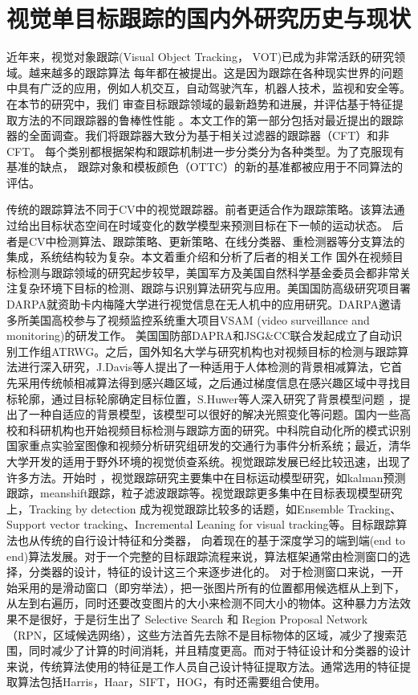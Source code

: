 \documentclass[promaster]{thesis-uestc}
\begin{document}
\section{视觉单目标跟踪的国内外研究历史与现状}

近年来，视觉对象跟踪(Visual Object Tracking， VOT)已成为非常活跃的研究领域。越来越多的跟踪算法
每年都在被提出。这是因为跟踪在各种现实世界的问题中具有广泛的应用，例如人机交互，自动驾驶汽车，机器人技术，监视和安全等。在本节的研究中，我们
审查目标跟踪领域的最新趋势和进展，并评估基于特征提取方法的不同跟踪器的鲁棒性性能
。本文工作的第一部分包括对最近提出的跟踪器的全面调查。我们将跟踪器大致分为基于相关过滤器的跟踪器（CFT）和非CFT。
每个类别都根据架构和跟踪机制进一步分类分为各种类型。为了克服现有基准的缺点，
跟踪对象和模板颜色（OTTC）的新的基准都被应用于不同算法的评估。

传统的跟踪算法不同于CV中的视觉跟踪器。前者更适合作为跟踪策略。该算法通过给出目标状态空间在时域变化的数学模型来预测目标在下一帧的运动状态。
后者是CV中检测算法、跟踪策略、更新策略、在线分类器、重检测器等分支算法的集成，系统结构较为复杂。本文着重介绍和分析了后者的相关工作
国外在视频目标检测与跟踪领域的研究起步较早，美国军方及美国自然科学基金委员会都非常关注复杂环境下目标的检测、跟踪与识别算法研究与应用。美国国防高级研究项目署DARPA就资助卡内梅隆大学进行视觉信息在无人机中的应用研究。DARPA邀请多所美国高校参与了视频监控系统重大项目VSAM (video surveillance and monitoring)的研发工作。
美国国防部DAPRA和JSG\&CC联合发起成立了自动识别工作组ATRWG。之后，国外知名大学与研究机构也对视频目标的检测与跟踪算法进行深入研究，J.Davis等人提出了一种适用于人体检测的背景相减算法，它首先采用传统帧相减算法得到感兴趣区域，之后通过梯度信息在感兴趣区域中寻找目标轮廓，通过目标轮廓确定目标位置，S.Huwer等人深入研究了背景模型问题
，提出了一种自适应的背景模型，该模型可以很好的解决光照变化等问题。国内一些高校和科研机构也开始视频目标检测与跟踪方面的研究。中科院自动化所的模式识别国家重点实验室图像和视频分析研究组研发的交通行为事件分析系统；最近，清华大学开发的适用于野外环境的视觉侦查系统。视觉跟踪发展已经比较迅速，出现了许多方法。开始时
，视觉跟踪研究主要集中在目标运动模型研究，如kalman预测跟踪，meanshift跟踪，粒子滤波跟踪等。视觉跟踪更多集中在目标表现模型研究上，Tracking by detection 成为视觉跟踪比较多的话题，如Ensemble Tracking、Support vector tracking、Incremental Leaning for visual tracking等。目标跟踪算法也从传统的自行设计特征和分类器，
向着现在的基于深度学习的端到端(end to end)算法发展。对于一个完整的目标跟踪流程来说，算法框架通常由检测窗口的选择，分类器的设计，特征的设计这三个来逐步进化的。
对于检测窗口来说，一开始采用的是滑动窗口（即穷举法），把一张图片所有的位置都用候选框从上到下，从左到右遍历，同时还要改变图片的大小来检测不同大小的物体。这种暴力方法效果不是很好，于是衍生出了 Selective Search 和 Region Proposal Network（RPN，区域候选网络），这些方法首先去除不是目标物体的区域，减少了搜索范围，同时减少了计算的时间消耗，并且精度更高。而对于特征设计和分类器的设计来说，传统算法使用的特征是工作人员自己设计特征提取方法。通常选用的特征提取算法包括Harris，Haar，SIFT，HOG，有时还需要组合使用。
\end{document}
